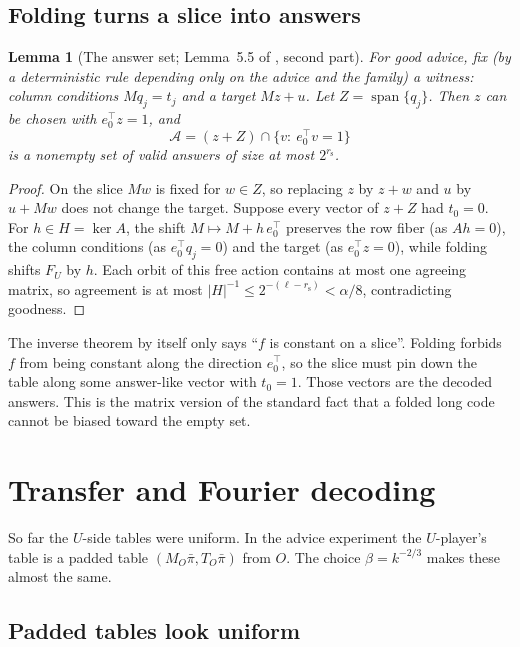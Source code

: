 \documentclass[11pt]{article}
\newtheorem{lemma}[theorem]{Lemma}
\theoremstyle{definition}
\theoremstyle{remark}
\newcommand{\cA}{\mathcal A}
\newcommand{\rs}{r_{\mathrm s}}
\newcommand{\bpi}{\bar\pi}
\DeclareMathOperator{\Span}{span}
\newcommand{\abs}[1]{\lvert #1\rvert}
\begin{document}
\subsection{Folding turns a slice into answers}

\begin{lemma}[The answer set; Lemma~5.5 of \cite{OpenAI-UGC}, second part]\label{lem:answer-set}
For good advice, fix (by a deterministic rule depending only on the advice and
the family) a witness: column conditions $Mq_j=t_j$ and a target $Mz+u$. Let
$Z=\Span\{q_j\}$. Then $z$ can be chosen with $e_0^\top z=1$, and
\[
\cA=(z+Z)\cap\{v:\ e_0^\top v=1\}
\]
is a nonempty set of valid answers of size at most $2^{\rs}$.
\end{lemma}

\begin{proof}
On the slice $Mw$ is fixed for $w\in Z$, so replacing $z$ by $z+w$ and $u$ by
$u+Mw$ does not change the target. Suppose every vector of $z+Z$ had $t_0=0$.
For $h\in H=\ker A$, the shift $M\mapsto M+h\,e_0^\top$ preserves the row fiber
(as $Ah=0$), the column conditions (as $e_0^\top q_j=0$) and the target (as
$e_0^\top z=0$), while folding shifts $F_U$ by $h$. Each orbit of this free
action contains at most one agreeing matrix, so agreement is at most
$\abs{H}^{-1}\le2^{-(\ell-\rs)}<\alpha/8$, contradicting goodness.
\end{proof}

\begin{idea}
The inverse theorem by itself only says ``$f$ is constant on a slice''.
Folding forbids $f$ from being constant along the direction $e_0^\top$, so the
slice must pin down the table along some answer-like vector with $t_0=1$.
Those vectors are the decoded answers. This is the matrix version of the
standard fact that a folded long code cannot be biased toward the empty set.
\end{idea}

\section{Transfer and Fourier decoding}\label{sec:decoding}

So far the $U$-side tables were uniform. In the advice experiment the
$U$-player's table is a padded table $(M_O\bpi,T_O\bpi)$ from $O$. The
choice $\beta=k^{-2/3}$ makes these almost the same.

\subsection{Padded tables look uniform}
\end{document}

